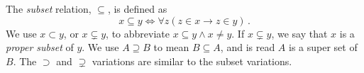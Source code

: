 \guard





\begin{defn}
\label{defn:subset}
\index{$\subseteq$}
  The \emph{subset} relation, $\subseteq$, is defined as \[ x\subseteq y\iff\forall z(z\in x\rightarrow z\in y)\,.\]
\index{$\subset$}
\index{$\subsetneq$}
  We use $x\subset y$, or $x\subsetneq y$, to abbreviate $x\subseteq y\wedge x\not=y$.
  If $x\subsetneq y$, we say that $x$ is a \emph{proper subset} of $y$.
\index{$\supseteq$}
  We use $A\supseteq B$ to mean $B\subseteq A$, and is read $A$ is a super set of $B$.
  The $\supset$ and $\supsetneq$ variations are similar to the subset variations.
\end{defn}
